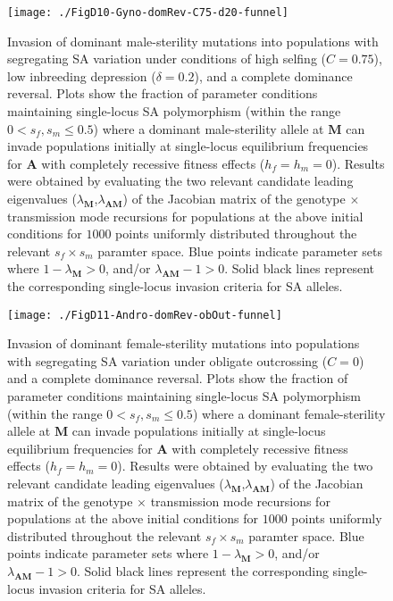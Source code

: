 \documentclass{article}
\begin{document}
\begin{figure}[ht!]
\centering
\texttt{[image: ./FigD10-Gyno-domRev-C75-d20-funnel]}
\caption{Invasion of dominant male-sterility mutations into populations with segregating SA variation under conditions of high selfing ($C = 0.75$), low inbreeding depression ($\delta = 0.2$), and a complete dominance reversal. Plots show the fraction of parameter conditions maintaining single-locus SA polymorphism (within the range $0 < s_f,s_m \leq 0.5$) where a dominant male-sterility allele at $\mathbf{M}$ can invade populations initially at single-locus equilibrium frequencies for $\mathbf{A}$ with completely recessive fitness effects ($h_f=h_m=0$). Results were obtained by evaluating the two relevant candidate leading eigenvalues ($\lambda_{\mathbf{M}}$,$\lambda_{\mathbf{AM}}$) of the Jacobian matrix of the genotype $\times$ transmission mode recursions for populations at the above initial conditions for $1000$ points uniformly distributed throughout the relevant $s_f \times s_m$ paramter space. Blue points indicate parameter sets where $1 - \lambda_{\mathbf{M}} > 0$, and/or $\lambda_{\mathbf{AM}} - 1 > 0$. Solid black lines represent the corresponding single-locus invasion criteria for SA alleles.}
\label{fig:GynC75d20FunnelDomRev}
\end{figure}
\newpage{}

\begin{figure}[ht!]
\centering
\texttt{[image: ./FigD11-Andro-domRev-obOut-funnel]}
\caption{Invasion of dominant female-sterility mutations into populations with segregating SA variation under obligate outcrossing ($C=0$) and a complete dominance reversal. Plots show the fraction of parameter conditions maintaining single-locus SA polymorphism (within the range $0 < s_f,s_m \leq 0.5$) where a dominant female-sterility allele at $\mathbf{M}$ can invade populations initially at single-locus equilibrium frequencies for $\mathbf{A}$ with completely recessive fitness effects ($h_f=h_m=0$). Results were obtained by evaluating the two relevant candidate leading eigenvalues ($\lambda_{\mathbf{M}}$,$\lambda_{\mathbf{AM}}$) of the Jacobian matrix of the genotype $\times$ transmission mode recursions for populations at the above initial conditions for $1000$ points uniformly distributed throughout the relevant $s_f \times s_m$ paramter space. Blue points indicate parameter sets where $1 - \lambda_{\mathbf{M}} > 0$, and/or $\lambda_{\mathbf{AM}} - 1 > 0$. Solid black lines represent the corresponding single-locus invasion criteria for SA alleles.}
\label{fig:AndObOutFunnelDomRev}
\end{figure}
\newpage{}
\end{document}
